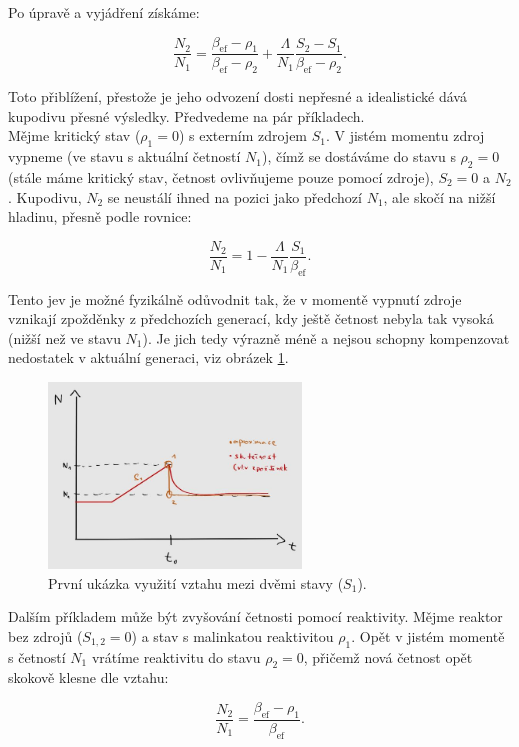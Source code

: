 Po úpravě a vyjádření získáme:

$$ \dfrac{N_2}{N_1} = \dfrac{\beta_{\text{ef}} - \rho_1}{\beta_{\text{ef}} - \rho_2} + \dfrac{\Lambda}{N_1} \dfrac{S_2 - S_1}{\beta_{\text{ef}} - \rho_2}. $$

Toto přiblížení, přestože je jeho odvození dosti nepřesné a idealistické dává kupodivu přesné výsledky. Předvedeme na pár příkladech.\\

Mějme kritický stav ($\rho_1 = 0$) s externím zdrojem $S_1$. V jistém momentu zdroj vypneme (ve stavu s aktuální četností $N_1$), čímž se dostáváme do stavu s $\rho_2 = 0$ (stále máme kritický stav, četnost ovlivňujeme pouze pomocí zdroje), $S_2 = 0$ a $N_2$. Kupodivu, $N_2$ se neustálí ihned na pozici jako předchozí $N_1$, ale skočí na nižší hladinu, přesně podle rovnice:

$$ \dfrac{N_2}{N_1} = 1 - \dfrac{\Lambda}{N_1} \dfrac{S_1}{\beta_{\text{ef}}}. $$

Tento jev je možné fyzikálně odůvodnit tak, že v momentě vypnutí zdroje vznikají zpožděnky z předchozích generací, kdy ještě četnost nebyla tak vysoká (nižší než ve stavu $N_1$). Je jich tedy výrazně méně a nejsou schopny kompenzovat nedostatek v aktuální generaci, viz obrázek \ref{fig_podil_N_1}.

\begin{figure}[H]
 \centering
 \includegraphics[width=0.6\textwidth]{img/podil_N_1.jpg}
 \caption{První ukázka využití vztahu mezi dvěmi stavy ($S_1$).}
 \label{fig_podil_N_1}
\end{figure}

Dalším příkladem může být zvyšování četnosti pomocí reaktivity. Mějme reaktor bez zdrojů ($S_{1,2} = 0$) a stav s malinkatou reaktivitou $\rho_1$. Opět v jistém momentě s četností $N_1$ vrátíme reaktivitu do stavu $\rho_2 = 0$, přičemž nová četnost opět skokově klesne dle vztahu:

$$ \dfrac{N_2}{N_1} = \dfrac{\beta_{\text{ef}} - \rho_1}{\beta_{\text{ef}}}. $$

